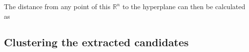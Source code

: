 




The distance from any point of this $\mathds{R}^n$ to the hyperplane can then be calculated as 


\subsection{Clustering the extracted candidates}

